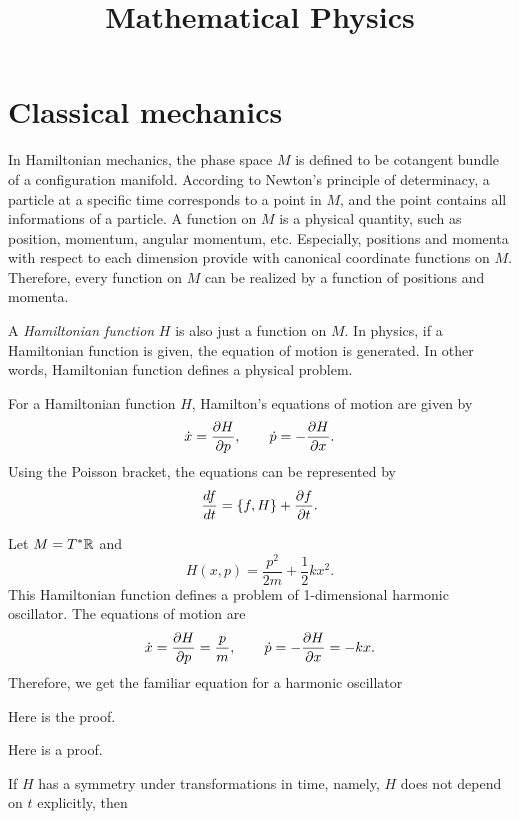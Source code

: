 \documentclass{../prb}
\title{Mathematical Physics}
\begin{document}
\maketitle
\tableofcontents


\chapter{Classical mechanics}



In Hamiltonian mechanics, the phase space $M$ is defined to be cotangent bundle of a configuration manifold.
According to Newton's principle of determinacy, a particle at a specific time corresponds to a point in $M$, and the point contains all informations of a particle.
A function on $M$ is a physical quantity, such as position, momentum, angular momentum, etc.
Especially, positions and momenta with respect to each dimension provide with canonical coordinate functions on $M$.
Therefore, every function on $M$ can be realized by a function of positions and momenta.

A \emph{Hamiltonian function} $H$ is also just a function on $M$.
In physics, if a Hamiltonian function is given, the equation of motion is generated.
In other words, Hamiltonian function defines a physical problem.

\begin{defn}
For a Hamiltonian function $H$, Hamilton's equations of motion are given by
\[\dot x=\pd{H}{p},\qquad\dot p=-\pd{H}{x}.\]
Using the Poisson bracket, the equations can be represented by
\[\dd{f}{t} = \{f,H\} + \pd{f}{t}.\]
\end{defn}

\begin{prb}
Let $M=T^*\mathbb{R}$ and
\[H(x,p)=\frac{p^2}{2m}+\frac12kx^2.\]
This Hamiltonian function defines a problem of 1-dimensional harmonic oscillator.
The equations of motion are
\[\dot x=\pd{H}{p}=\frac pm,\qquad\dot p=-\pd{H}{x}=-kx.\]
Therefore, we get the familiar equation for a harmonic oscillator
\end{prb}
\begin{sol}
\item Here is the proof.
\item Here is a proof.
\end{sol}


If $H$ has a symmetry under transformations in time, namely, $H$ does not depend on $t$ explicitly, then 
\end{document}
